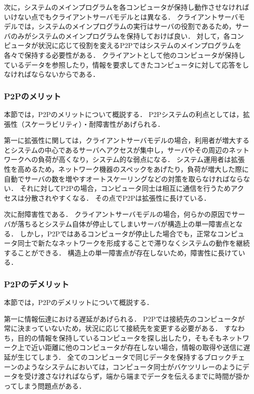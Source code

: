 次に，システムのメインプログラムを各コンピュータが保持し動作させなければいけない点でもクライアントサーバモデルとは異なる．
クライアントサーバモデルでは，システムのメインプログラムの実行はサーバの役割であるため，サーバのみがシステムのメインプログラムを保持しておけば良い．
対して，各コンピュータが状況に応じて役割を変えるP2Pではシステムのメインプログラムを各々で保持する必要性がある．
クライアントとして他のコンピュータが保持しているデータを参照したり，情報を要求してきたコンピュータに対して応答をしなければならないからである．

\subsubsection{P2Pのメリット}

本節では，P2Pのメリットについて概説する．
P2Pシステムの利点としては，拡張性（スケーラビリティ）・耐障害性があげられる．

第一に拡張性に関しては，クライアントサーバモデルの場合，利用者が増大するとシステムの中心であるサーバへアクセスが集中し，サーバやその周辺のネットワークへの負荷が高くなり，システム的な弱点になる．
システム運用者は拡張性を高めるため，ネットワーク機器のスペックをあげたり，負荷が増大した際に自動でサーバの数を増やすオートスケーリングなどの対策を取らなければならない．
それに対してP2Pの場合，コンピュータ同士は相互に通信を行うためアクセスは分散されやすくなる．
その点でP2Pは拡張性に長けている．

次に耐障害性である．
クライアントサーバモデルの場合，何らかの原因でサーバが落ちるとシステム自体が停止してしまいサーバが構造上の単一障害点となる．
しかし，P2Pではあるコンピュータが停止した場合でも，正常なコンピュータ同士で新たなネットワークを形成することで滞りなくシステムの動作を継続することができる．
構造上の単一障害点が存在しないため，障害性に長けている．

\subsubsection{P2Pのデメリット}

本節では，P2Pのデメリットについて概説する．

第一に情報伝達における遅延があげられる．
P2Pでは接続先のコンピュータが常に決まっていないため，状況に応じて接続先を変更する必要がある．
すなわち，目的の情報を保持しているコンピュータを探し出したり，そもそもネットワーク上で近い距離に他のコンピュータが存在しない場合，情報の取得や送信に遅延が生じてしまう．
全てのコンピュータで同じデータを保持するブロックチェーンのようなシステムにおいては，コンピュータ同士がバケツリレーのようにデータを受け渡さなければならず，端から端までデータを伝えるまでに時間が掛かってしまう問題点がある．

